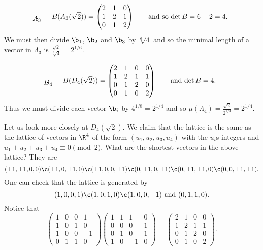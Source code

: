 \[ \begin{picture}(2,0)(0,-0.25)\put(0,0){\circle*{0.2}}\put(1,0){\circle*{0.2}}\put(2,0){\circle*{0.2}}\put(0,0){\line(1,0){2}}\put(1,-0.5){\makebox(0,0){$A_3$}}\end{picture} \qquad B(A_3(\sqrt2)) = \begin{pmatrix} 2 & 1 & 0 \\ 1 & 2 & 1 \\ 0 & 1 & 2 \end{pmatrix} \qquad \text{and so $\det B=6-2=4$} . \]%
We must then divide $\b_1$, $\b_2$ and $\b_3$ by $\sqrt[6]4$ and so the minimal length of a vector in $\Lambda_3$ is $\frac{\sqrt2}{\sqrt[6]4}=2^{1/6}$.

\[ \begin{picture}(1.707,0)(0,-0.25)\put(0,0){\circle*{0.2}}\put(1,0){\circle*{0.2}}\put(1.707,0.707){\circle*{0.2}}\put(1.707,-0.707){\circle*{0.2}}\put(0,0){\line(1,0){1}}\put(1,0){\line(1,1){0.707}}\put(1,0){\line(1,-1){0.707}}\put(0.854,-0.5){\makebox(0,0){$D_4$}}\end{picture} \qquad B(D_4(\sqrt2)) = \begin{pmatrix} 2 & 1 & 0 & 0 \\ 1 & 2 & 1 & 1 \\ 0 & 1 & 2 & 0 \\ 0 & 1 & 0 & 2 \end{pmatrix} \qquad \text{and $\det B=4$} . \]%
Thus we must divide each vector $\b_i$ by $4^{1/8}=2^{1/4}$ and so $\mu(\Lambda_4)=\frac{\sqrt2}{2^{1/4}}=2^{1/4}$.

Let us look more closely at $D_4(\sqrt2)$.  We claim that the lattice is the same as the lattice of vectors in $\R^4$ of the form $(u_1,u_2,u_3,u_4)$ with the $u_i$s integers and $u_1+u_2+u_3+u_4\equiv0\pmod2$.  What are the shortest vectors in the above lattice?  They are
\[ (\pm1,\pm1,0,0)\c  (\pm1,0,\pm1,0)\c  (\pm1,0,0,\pm1)\c  (0,\pm1,0,\pm1)\c  (0,\pm1,\pm1,0)\c  (0,0,\pm1,\pm1) . \]
One can check that the lattice is generated by
\[ (1,0,0,1)\c  (1,0,1,0)\c  (1,0,0,-1) \text{ and } (0,1,1,0) . \]
Notice that
\[ \begin{pmatrix} 1 & 0 & 0 & 1 \\ 1 & 0 & 1 & 0 \\ 1 & 0 & 0 & -1 \\ 0 & 1 & 1 & 0 \end{pmatrix}
\begin{pmatrix} 1 & 1 & 1 & 0 \\ 0 & 0 & 0 & 1 \\ 0 & 1 & 0 & 1 \\ 1 & 0 & -1 & 0 \end{pmatrix}
=
\begin{pmatrix} 2 & 1 & 0 & 0 \\ 1 & 2 & 1 & 1 \\ 0 & 1 & 2 & 0 \\ 0 & 1 & 0 & 2 \end{pmatrix} . \]
